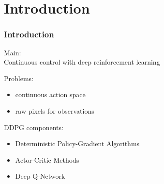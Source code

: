 \section{Introduction}

\begin{frame}
\frametitle{Introduction}
Main:\\
Continuous control with deep reinforcement learning~\cite{Lillicrap2015}
\vspace{2mm}

Problems:
\begin{itemize}
  \item continuous action space
  \item raw pixels for observations
\end{itemize}

DDPG components:
\begin{itemize}
  \item Deterministic Policy-Gradient Algorithms \cite{Silver2014}
  \item Actor-Critic Methods \cite{Sutton1998}
  \item Deep Q-Network \cite{Mnih2013}
\end{itemize}


\end{frame}
